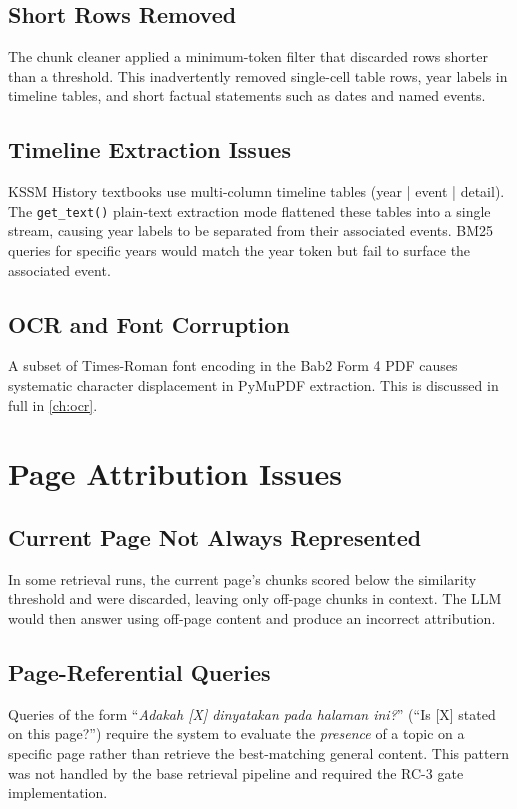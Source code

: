 \documentclass[12pt, a4paper]{report}
\newcommand{\codeinline}[1]{\texttt{#1}}
\begin{document}
\subsection{Short Rows Removed}

The chunk cleaner applied a minimum-token filter that discarded rows shorter
than a threshold. This inadvertently removed single-cell table rows, year labels
in timeline tables, and short factual statements such as dates and named events.

\subsection{Timeline Extraction Issues}

KSSM History textbooks use multi-column timeline tables (year | event | detail).
The \codeinline{get\_text()} plain-text extraction mode flattened these tables
into a single stream, causing year labels to be separated from their associated
events. BM25 queries for specific years would match the year token but fail to
surface the associated event.

\subsection{OCR and Font Corruption}

A subset of Times-Roman font encoding in the Bab2 Form 4 PDF causes systematic
character displacement in PyMuPDF extraction. This is discussed in full in
\cref{ch:ocr}.

\section{Page Attribution Issues}

\subsection{Current Page Not Always Represented}

In some retrieval runs, the current page's chunks scored below the similarity
threshold and were discarded, leaving only off-page chunks in context. The LLM
would then answer using off-page content and produce an incorrect attribution.

\subsection{Page-Referential Queries}

Queries of the form ``\textit{Adakah [X] dinyatakan pada halaman ini?}''
(``Is [X] stated on this page?'') require the system to evaluate the
\emph{presence} of a topic on a specific page rather than retrieve the
best-matching general content. This pattern was not handled by the base
retrieval pipeline and required the RC-3 gate implementation.
\end{document}
